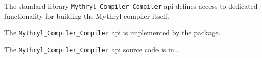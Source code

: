 
The standard library {\tt Mythryl\_Compiler\_Compiler} api defines access to dedicated functionality 
for building the Mythryl compiler itself.

The {\tt Mythryl\_Compiler\_Compiler} api is implemented by the  package.

The {\tt Mythryl\_Compiler\_Compiler} api source code is in .
